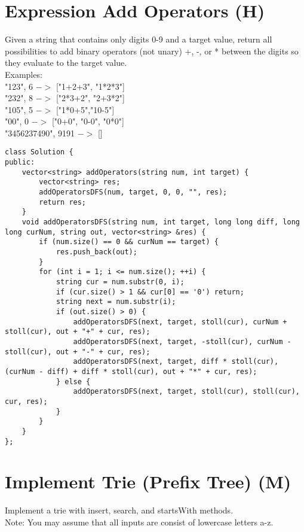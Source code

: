 \section{Expression Add Operators (H)}
Given a string that contains only digits 0-9 and a target value, return all possibilities to add binary operators (not unary) +, -, or * between the digits so they evaluate to the target value.\\

Examples:\\
"123", 6 $->$ ["1+2+3", "1*2*3"] \\
"232", 8 $->$ ["2*3+2", "2+3*2"]\\
"105", 5 $->$ ["1*0+5","10-5"]\\
"00", 0 $->$ ["0+0", "0-0", "0*0"]\\
"3456237490", 9191 $->$ []\\

\begin{lstlisting}
class Solution {
public:
    vector<string> addOperators(string num, int target) {
        vector<string> res;
        addOperatorsDFS(num, target, 0, 0, "", res);
        return res;
    }
    void addOperatorsDFS(string num, int target, long long diff, long long curNum, string out, vector<string> &res) {
        if (num.size() == 0 && curNum == target) {
            res.push_back(out);
        }
        for (int i = 1; i <= num.size(); ++i) {
            string cur = num.substr(0, i);
            if (cur.size() > 1 && cur[0] == '0') return;
            string next = num.substr(i);
            if (out.size() > 0) {
                addOperatorsDFS(next, target, stoll(cur), curNum + stoll(cur), out + "+" + cur, res);
                addOperatorsDFS(next, target, -stoll(cur), curNum - stoll(cur), out + "-" + cur, res);
                addOperatorsDFS(next, target, diff * stoll(cur), (curNum - diff) + diff * stoll(cur), out + "*" + cur, res);
            } else {
                addOperatorsDFS(next, target, stoll(cur), stoll(cur), cur, res);
            }
        }
    }
};
\end{lstlisting}


\section{Implement Trie (Prefix Tree) (M)}
Implement a trie with insert, search, and startsWith methods.\\

Note:
You may assume that all inputs are consist of lowercase letters a-z. \\

